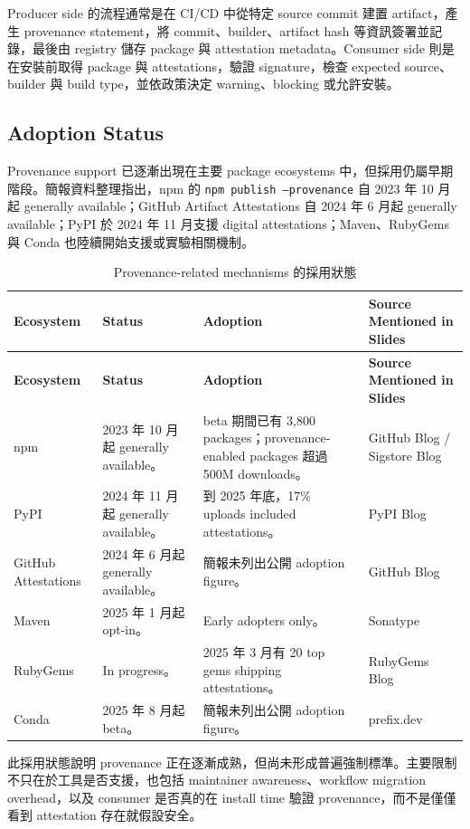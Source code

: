 \documentclass[12pt,a4paper]{article}
\begin{document}
Producer side 的流程通常是在 CI/CD 中從特定 source commit 建置 artifact，產生 provenance statement，將 commit、builder、artifact hash 等資訊簽署並記錄，最後由 registry 儲存 package 與 attestation metadata。Consumer side 則是在安裝前取得 package 與 attestations，驗證 signature，檢查 expected source、builder 與 build type，並依政策決定 warning、blocking 或允許安裝。

\subsection{Adoption Status}

Provenance support 已逐漸出現在主要 package ecosystems 中，但採用仍屬早期階段。簡報資料整理指出，npm 的 \texttt{npm publish --provenance} 自 2023 年 10 月起 generally available；GitHub Artifact Attestations 自 2024 年 6 月起 generally available；PyPI 於 2024 年 11 月支援 digital attestations；Maven、RubyGems 與 Conda 也陸續開始支援或實驗相關機制。

\begin{longtable}{P{2.7cm}P{4.3cm}P{4cm}P{4.2cm}}
\caption{Provenance-related mechanisms 的採用狀態}\\
\toprule
\textbf{Ecosystem} & \textbf{Status} & \textbf{Adoption} & \textbf{Source Mentioned in Slides} \\
\midrule
\endfirsthead
\toprule
\textbf{Ecosystem} & \textbf{Status} & \textbf{Adoption} & \textbf{Source Mentioned in Slides} \\
\midrule
\endhead
npm & 2023 年 10 月起 generally available。 & beta 期間已有 3,800 packages；provenance-enabled packages 超過 500M downloads。 & GitHub Blog / Sigstore Blog \\
\addlinespace
PyPI & 2024 年 11 月起 generally available。 & 到 2025 年底，17\% uploads included attestations。 & PyPI Blog \\
\addlinespace
GitHub Attestations & 2024 年 6 月起 generally available。 & 簡報未列出公開 adoption figure。 & GitHub Blog \\
\addlinespace
Maven & 2025 年 1 月起 opt-in。 & Early adopters only。 & Sonatype \\
\addlinespace
RubyGems & In progress。 & 2025 年 3 月有 20 top gems shipping attestations。 & RubyGems Blog \\
\addlinespace
Conda & 2025 年 8 月起 beta。 & 簡報未列出公開 adoption figure。 & prefix.dev \\
\bottomrule
\end{longtable}

此採用狀態說明 provenance 正在逐漸成熟，但尚未形成普遍強制標準。主要限制不只在於工具是否支援，也包括 maintainer awareness、workflow migration overhead，以及 consumer 是否真的在 install time 驗證 provenance，而不是僅僅看到 attestation 存在就假設安全。
\end{document}
